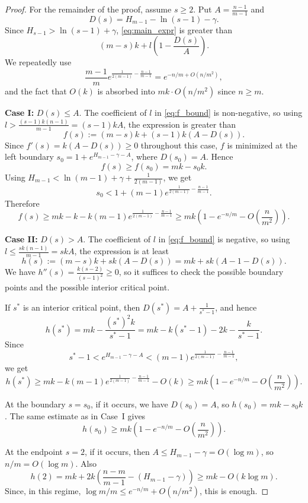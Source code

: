\documentclass[10pt,a4paper]{amsart}
\begin{document}
\begin{proof}
        For the remainder of the proof, assume $s\geq 2$. Put
    $A=\frac{n-1}{m-1}$ and
    \[
    D(s)=H_{m-1}-\ln(s-1)-\gamma.
    \]
    Since $H_{s-1}>\ln(s-1)+\gamma$, \eqref{eq:main_expr} is greater than
    \begin{equation}\label{eq:f_bound}
    (m-s)k+l\left(1-\frac{D(s)}{A}\right).
    \end{equation}
    We repeatedly use
    \[
    \frac{m-1}{m}e^{\frac{1}{2(m-1)}-\frac{n-1}{m-1}}
    =
    e^{-n/m+O(n/m^2)},
    \]
    and the fact that $O(k)$ is absorbed into $mk\cdot O(n/m^2)$ since
    $n\geq m$.

    \textbf{Case I:} $D(s)\leq A$. The coefficient of $l$ in
    \eqref{eq:f_bound} is non-negative, so using
    $l>\frac{(s-1)k(n-1)}{m-1}=(s-1)kA$, the expression is greater than
    \[
    f(s):=(m-s)k+(s-1)k(A-D(s)).
    \]
    Since $f'(s)=k(A-D(s))\geq 0$ throughout this case, $f$ is minimized at
    the left boundary $s_0=1+e^{H_{m-1}-\gamma-A}$, where $D(s_0)=A$. Hence
    \[
    f(s)\geq f(s_0)=mk-s_0k.
    \]
    Using $H_{m-1}<\ln(m-1)+\gamma+\frac{1}{2(m-1)}$, we get
    \[
    s_0<1+(m-1)e^{\frac{1}{2(m-1)}-\frac{n-1}{m-1}}.
    \]
    Therefore
    \[
    f(s)
    \geq
    mk-k-k(m-1)e^{\frac{1}{2(m-1)}-\frac{n-1}{m-1}}
    \geq
    mk\left(1-e^{-n/m}-O\left(\frac{n}{m^2}\right)\right).
    \]

    \textbf{Case II:} $D(s)>A$. The coefficient of $l$ in
    \eqref{eq:f_bound} is negative, so using
    $l\leq \frac{sk(n-1)}{m-1}=skA$, the expression is at least
    \[
    h(s):=(m-s)k+sk(A-D(s))
    =
    mk+sk(A-1-D(s)).
    \]
    We have $h''(s)=\frac{k(s-2)}{(s-1)^2}\geq 0$, so it suffices to check
    the possible boundary points and the possible interior critical point.

    If $s^*$ is an interior critical point, then
    $D(s^*)=A+\frac{1}{s^*-1}$, and hence
    \[
    h(s^*)=
    mk-\frac{(s^*)^2k}{s^*-1}
    =
    mk-k(s^*-1)-2k-\frac{k}{s^*-1}.
    \]
    Since
    \[
    s^*-1<e^{H_{m-1}-\gamma-A}
    <
    (m-1)e^{\frac{1}{2(m-1)}-\frac{n-1}{m-1}},
    \]
    we get
    \[
    h(s^*)\geq
    mk-k(m-1)e^{\frac{1}{2(m-1)}-\frac{n-1}{m-1}}-O(k)
    \geq
    mk\left(1-e^{-n/m}-O\left(\frac{n}{m^2}\right)\right).
    \]

    At the boundary $s=s_0$, if it occurs, we have $D(s_0)=A$, so
    $h(s_0)=mk-s_0k$. The same estimate as in Case~I gives
    \[
    h(s_0)\geq
    mk\left(1-e^{-n/m}-O\left(\frac{n}{m^2}\right)\right).
    \]

    At the endpoint $s=2$, if it occurs, then
    $A\leq H_{m-1}-\gamma=O(\log m)$, so $n/m=O(\log m)$. Also
    \[
    h(2)=
    mk+
    2k\left(\frac{n-m}{m-1}-(H_{m-1}-\gamma)\right)
    \geq
    mk-O(k\log m).
    \]
    Since, in this regime,
    $\log m/m\leq e^{-n/m}+O(n/m^2)$, this is enough.


\end{proof}
\end{document}
